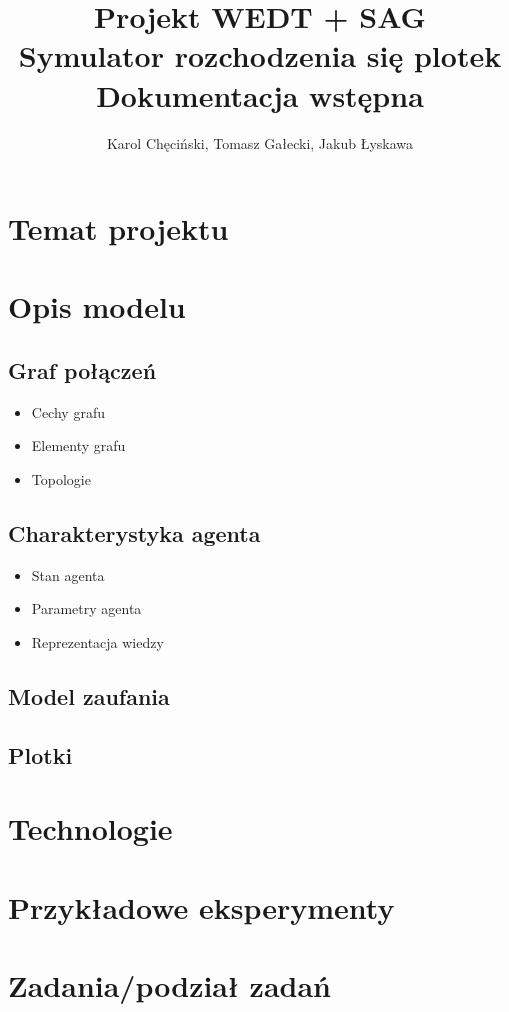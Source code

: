 \documentclass{article}
\title{Projekt WEDT + SAG \\ Symulator rozchodzenia się plotek \\ Dokumentacja wstępna}
\author{Karol Chęciński, Tomasz Gałecki, Jakub Łyskawa}
\begin{document}
	\maketitle
	\section{Temat projektu}
	\section{Opis modelu}
	\subsection{Graf połączeń}
	\begin{itemize}
		\item{Cechy grafu}
		\item{Elementy grafu}
		\item{Topologie}
	\end{itemize}
	\subsection{Charakterystyka agenta}
	\begin{itemize}
		\item{Stan agenta}
		\item{Parametry agenta}
		\item{Reprezentacja wiedzy}
	\end{itemize}
	\subsection{Model zaufania}
	\subsection{Plotki}
	\section{Technologie}
	\section{Przykładowe eksperymenty}
	\section{Zadania/podział zadań}
\end{document}

